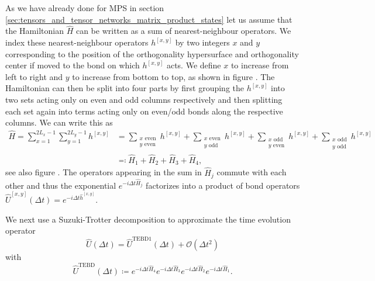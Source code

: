 As we have already done for MPS in section \ref{sec:tensors_and_tensor_networks_matrix_product_states} let us assume that the Hamiltonian $\hat{H}$ can be written as a sum of nearest-neighbour operators. We index these nearest-neighbour operators $h^{[x, y]}$ by two integers $x$ and $y$ corresponding to the position of the orthogonality hypersurface and orthogonality center if moved to the bond on which $h^{[x,y]}$ acts. We define $x$ to increase from left to right and $y$ to increase from bottom to top, as shown in figure . The Hamiltonian can then be split into four parts by first grouping the $h^{[x,y]}$ into two sets acting only on even and odd columns respectively and then splitting each set again into terms acting only on even/odd bonds along the respective columns. We can write this as
\begin{equation}
	\label{eq:disoTPS_TEBD_splitting_local_Hamiltonian}
	\begin{split}
		\hat{H} = \sum_{x=1}^{2L_x-1} \sum_{y=1}^{2L_y-1}h^{[x,y]} &= \sum_{\substack{x\text{ even}\\y\text{ even}}} h^{[x, y]} + \sum_{\substack{x\text{ even}\\y\text{ odd}}} h^{[x, y]} + \sum_{\substack{x\text{ odd}\\y\text{ even}}} h^{[x, y]} + \sum_{\substack{x\text{ odd}\\y\text{ odd}}} h^{[x, y]} \\
		&\eqqcolon \hat{H}_1 + \hat{H}_2 + \hat{H}_3 + \hat{H}_4,
	\end{split}
\end{equation}
see also figure . The operators appearing in the sum in $\hat{H}_j$ commute with each other and thus the exponential $e^{-i\Delta t\hat{H}_j}$ factorizes into a product of bond operators $\hat{U}^{[x, y]}(\Delta t) = e^{-i\Delta t\hat{h}^{[x, y]}}$. \par
We next use a Suzuki-Trotter decomposition to approximate the time evolution operator
\begin{equation}
	\label{eq:disoTPS_TEBD_suzuki_trotter_first_order}
	\hat{U}(\Delta t) = \hat{U}^\text{TEBD1}(\Delta t) + \mathcal{O}(\Delta t^2)
\end{equation}
with
\begin{equation}
	\label{eq:disoTPS_TEBD_first_order_TEBD_operator}
	\hat{U}^\text{TEBD}(\Delta t) \coloneqq e^{-i\Delta t\hat{H}_4} e^{-i\Delta t\hat{H}_3} e^{-i\Delta t\hat{H}_2} e^{-i\Delta t\hat{H}_1}.
\end{equation}
